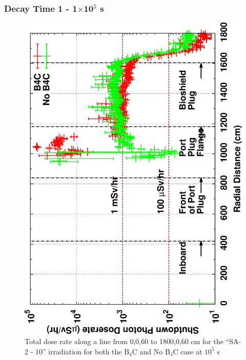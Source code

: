 \documentclass[12pt]{article}
\begin{document}
\subsubsection{Decay Time 1 - 1$\times$10$^{5}$ s}
\begin{figure}[ht!]
\centering
\includegraphics[clip,scale=0.12,angle=-90]{../plots/photon_lineout/comp/5yr_dc1.png}
\caption{Total dose rate along a line from 0,0,60 to 1800,0,60 cm for the ``SA-2 - 10'' irradiation
for both the B$_4$C and No B$_4$C case at $10^5$ s}
\label{fig:photons_5y_dc1_dose}
\end{figure}
\end{document}
